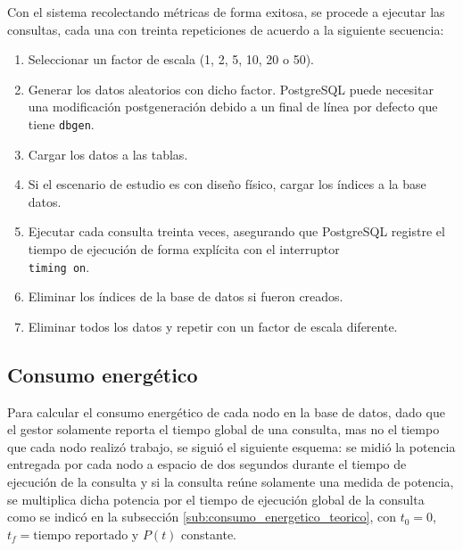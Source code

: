 \documentclass[12pt, letter paper]{report}
\begin{document}
        Con el sistema recolectando métricas de forma exitosa, se procede a
        ejecutar las consultas, cada una con treinta repeticiones de acuerdo a
        la siguiente secuencia:

        \begin{enumerate}
          \item Seleccionar un factor de escala (1, 2, 5, 10, 20 o 50).
          \item Generar los datos aleatorios con dicho factor. PostgreSQL puede
          necesitar una modificación postgeneración debido a un final de línea
          por defecto que tiene \texttt{dbgen}.
          \item Cargar los datos a las tablas.
          \item Si el escenario de estudio es con diseño físico, cargar los
          índices a la base datos.
          \item Ejecutar cada consulta treinta veces, asegurando que PostgreSQL
          registre el tiempo de ejecución de forma explícita con el interruptor
          \texttt{\\timing on}.
          \item Eliminar los índices de la base de datos si fueron creados.
          \item Eliminar todos los datos y repetir con un factor de escala
          diferente.
        \end{enumerate}

      \subsection{Consumo energético} %
      \label{sub:consumo_energetico}
        Para calcular el consumo energético de cada nodo en la base de datos,
        dado que el gestor solamente reporta el tiempo global de una consulta,
        mas no el tiempo que cada nodo realizó trabajo, se siguió el siguiente
        esquema: se midió la potencia entregada por cada nodo a espacio de dos
        segundos durante el tiempo de ejecución de la consulta y si la consulta
        reúne solamente una medida de potencia, se multiplica dicha potencia por
        el tiempo de ejecución global de la consulta como se indicó en la
        subsección \ref{sub:consumo_energetico_teorico}, con $t_0 = 0$, $t_f =
        \text{tiempo reportado}$ y $P(t)$ constante.
\end{document}
